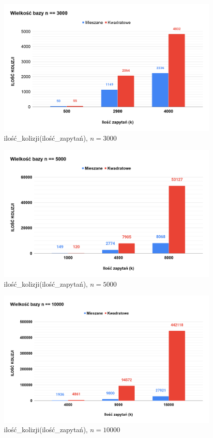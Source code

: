 \documentclass{article}
\begin{document}
\begin{figure}[H]
	\centering
	\includegraphics[scale=0.24]{kolizjen3k.png}
	\caption{ilość\_kolizji(ilość\_zapytań), $n = 3000$}
	\label{fig:kolizjen3k}
\end{figure}
\begin{figure}[H]
	\centering
	\includegraphics[scale=0.25]{kolizjen5k.png}
	\caption{ilość\_kolizji(ilość\_zapytań), $n = 5000$}
	\label{fig:kolizjen5k}
\end{figure}
\begin{figure}[H]
	\centering
	\includegraphics[scale=0.24]{kolizjen10k.png}
	\caption{ilość\_kolizji(ilość\_zapytań), $n = 10000$}
	\label{fig:kolizjen10k}
\end{figure}
\end{document}

